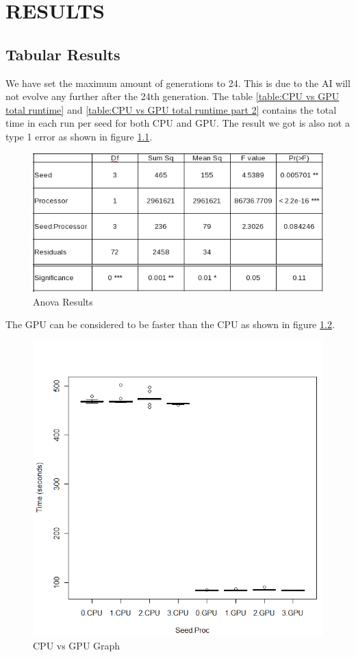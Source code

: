 \chapter{RESULTS}
\section{Tabular Results} 
We have set the maximum amount of generations to 24. This is due to the AI
will not evolve any further after the 24th generation. The 
table \ref{table:CPU vs GPU total runtime} and 
\ref{table:CPU vs GPU total runtime part 2} contains the total time in each
run per seed for both CPU and GPU. The result we got is also not a type 1 
error as shown in figure \ref{fig:anova_result}.
\begin{figure}
	\centering
		\graphicspath{{images/}}
		\includegraphics[width=260 pt]{Anova_Results.png}
	\caption{Anova Results}
	\label{fig:anova_result}
\end{figure}
The GPU can be considered to be faster than the CPU as shown in figure
\ref{fig:anova_result_graph}.
\begin{figure}
	\centering
		\graphicspath{{images/}}
		\includegraphics[width=260 pt]{Anova_Result_Graph.png}
	\caption{CPU vs GPU Graph}
	\label{fig:anova_result_graph}
\end{figure}

